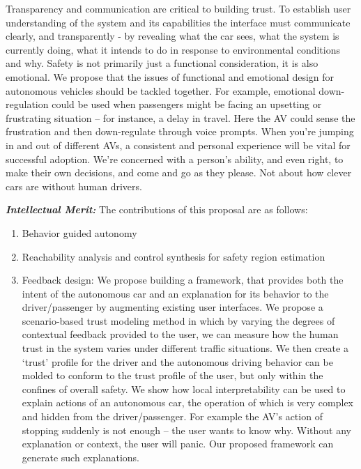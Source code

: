 Transparency and communication are critical to building trust. To establish user understanding of the system and its capabilities the interface must communicate clearly, and transparently - by revealing what the car sees, what the system is currently doing, what it intends to do in response to environmental conditions and why. 
Safety is not primarily just a functional consideration, it is also emotional. We propose that the issues of functional and emotional design for autonomous vehicles should be tackled together.
For example, emotional down-regulation could be used when passengers might be facing an upsetting or frustrating situation – for instance, a delay in travel. Here the AV could sense the frustration and then down-regulate through voice prompts. When you’re jumping in and out of different AVs, a consistent and personal experience will be vital for successful adoption.
 We’re concerned with a person’s ability, and even right, to make their own decisions, and come and go as they please. Not about how clever cars are without human drivers. 

\noindent\emph{\textbf{Intellectual Merit:}} The contributions of this proposal are as follows:
\begin{enumerate}
    \item Behavior guided autonomy  
    \item Reachability analysis and control synthesis for safety region estimation 
    \item Feedback design: We propose building a framework, that provides both the intent of the autonomous car and an explanation for its behavior to the driver/passenger by augmenting existing user interfaces. We propose a scenario-based trust modeling method in which by varying the degrees of contextual feedback provided to the user, we can measure how the human trust in the system varies under different traffic situations. We then create a ‘trust’ profile for the driver and the autonomous driving behavior can be molded to conform to the trust profile of the user, but only within the confines of overall safety. We show how local interpretability can be used to explain actions of an autonomous car, the operation of which is very complex and hidden from the driver/passenger. For example the AV’s action of stopping suddenly is not enough – the user wants to know why. Without any explanation or context, the user will panic. Our proposed framework can generate such explanations. 
\end{enumerate}


